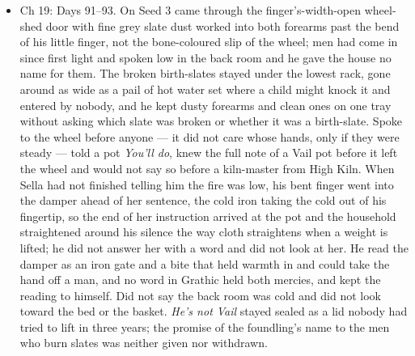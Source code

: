 \documentclass{design/chronicle}
\begin{document}
{\begin{itemize}[leftmargin=1.4em,itemsep=1pt,topsep=3pt,parsep=0pt]
\item Ch 19: Days 91–93. On Seed 3 came through the finger’s-width-open wheel-shed door with fine grey slate dust worked into both forearms past the bend of his little finger, not the bone-coloured slip of the wheel; men had come in since first light and spoken low in the back room and he gave the house no name for them. The broken birth-slates stayed under the lowest rack, gone around as wide as a pail of hot water set where a child might knock it and entered by nobody, and he kept dusty forearms and clean ones on one tray without asking which slate was broken or whether it was a birth-slate. Spoke to the wheel before anyone --- it did not care whose hands, only if they were steady --- told a pot \emph{You’ll do}, knew the full note of a Vail pot before it left the wheel and would not say so before a kiln-master from High Kiln. When Sella had not finished telling him the fire was low, his bent finger went into the damper ahead of her sentence, the cold iron taking the cold out of his fingertip, so the end of her instruction arrived at the pot and the household straightened around his silence the way cloth straightens when a weight is lifted; he did not answer her with a word and did not look at her. He read the damper as an iron gate and a bite that held warmth in and could take the hand off a man, and no word in Grathic held both mercies, and kept the reading to himself. Did not say the back room was cold and did not look toward the bed or the basket. \emph{He’s not Vail} stayed sealed as a lid nobody had tried to lift in three years; the promise of the foundling’s name to the men who burn slates was neither given nor withdrawn.

\end{itemize}

\begin{itemize}[leftmargin=1.4em,itemsep=1pt,topsep=3pt,parsep=0pt]


\end{itemize}}
\end{document}
